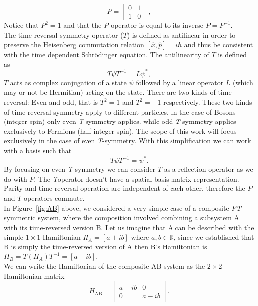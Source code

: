 \documentclass[10pt, a4paper, singlespacing]{report}
\newcommand\PT{\emph{PT}}
\newcommand\PP{\emph{P}}
\newcommand\TT{\emph{T}}
\begin{document}
\begin{equation} \label{eq:2}
P = \begin{bmatrix}
0 & 1 \\ 
1 & 0
\end{bmatrix},
\end{equation}
Notice that $P^2 = 1$ and that the \PP-operator is equal to its inverse $P = P^{-1}$.\\
The time-reversal symmetry operator ($T$) is defined as antilinear in order to preserve the Heisenberg commutation relation $[\hat{x}, \hat{p}] = i\hbar$\cite{BenderPT} and thus be consistent with the time dependent Schrödinger equation\cite{Jones-Smith}.
The antilinearity of $T$ is defined as 
\begin{equation} \label{eq:3}
T \psi T^{-1}= L \psi^{*},
\end{equation}
$T$ acts as complex conjugation of a state $\psi$ followed by a linear operator $L$ (which may or not be Hermitian) acting on the state. There are two kinds of time-reversal: Even and odd, that is $T^2 = 1$ and $T^2 = -1$ respectively. These two kinds of time-reversal symmetry apply to different particles. In the case of Bosons (integer spin) only even \TT-symmetry applies. while odd \TT-symmetry applies exclusively to Fermions (half-integer spin)\cite{Jones-Smith}.
The scope of this work will focus exclusively in the case of even \TT-symmetry. With this simplification we can work with a basis such that 
\begin{equation} \label{eq:4}
T \psi T^{-1} = \psi^{*}.
\end{equation}
By focusing on even \TT-symmetry we can consider $T$ as a reflection operator as we do with $P$. The \TT operator doesn't have a spatial basis matrix representation.\\
Parity and time-reversal operation are independent of each other, therefore the $P$ and $T$ operators commute\cite{BenderPT}.\\
In Figure~\ref{fig:AB} above, we considered a very simple case of a composite \PT-symmetric system, where the composition involved combining a subsystem A with its time-reversed version B.
Let us imagine that A can be described with the simple $1 \times 1 $ Hamiltonian $H_{A} = [a+ib]$ where $a, b \in \mathds{R}$, since we established that B is simply the time-reversed version of A then B's Hamiltonian is $H_{B} = T (H_{A}) T^{-1} = [a-ib]$.\\
We can write the Hamiltonian of the composite AB system as the $2 \times 2$ Hamiltonian matrix
\begin{equation} \label{eq:5}
H_{\mathrm{AB}} = \begin{bmatrix}
a+ib & 0 \\ 
0 & a-ib
\end{bmatrix}.
\end{equation}
\end{document}
